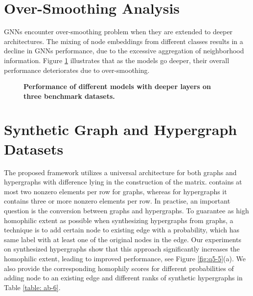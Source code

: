 \documentclass[review]{elsarticle}
\begin{document}
\section{Over-Smoothing Analysis}

GNNs encounter over-smoothing problem when they are extended to deeper architectures. The mixing of node embeddings from different classes results in a decline in GNNs performance, due to the excessive aggregation of neighborhood information. Figure \ref{fig:q8-9} illustrates that as the models go deeper, their overall performance deteriorates due to over-smoothing.

\begin{figure}[htbp]
  \centering
  \caption{\textbf{Performance of different models with deeper layers on three benchmark datasets.}}
  \label{fig:q8-9}
\end{figure}

\section{Synthetic Graph and Hypergraph Datasets}

The proposed framework utilizes a universal architecture for both graphs and hypergraphs with difference lying in the construction of the  matrix.  contains at most two nonzero elements per row for graphs, whereas for hypergraphs it contains three or more nonzero elements per row. In practise, an important question is the conversion between graphs and hypergraphs. To guarantee as high homophilic extent as possible when synthesizing hypergraphs from graphs, a technique is to add certain node to existing edge with a probability, which has same label with at least one of the original nodes in the edge. Our experiments on synthesized hypergraphs show that this approach significantly increases the homophilic extent, leading to improved performance, see Figure \ref{fig:q5-5}(a). We also provide the corresponding homophily scores for different probabilities of adding node to an existing edge and different ranks of synthetic hypergraphs in Table \ref{table: ab-6}.
\end{document}
